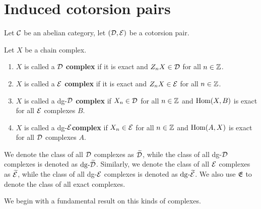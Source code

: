 \section{Induced cotorsion pairs}
Let $\mathcal{C}$ be an abelian category, let $(\mathcal{D}, \mathcal{E})$ be a cotorsion pair.

\begin{definition}
    Let $X$ be a chain complex.
    \begin{enumerate}
		\itemsep0em 
		\item $X$ is called a $\mathcal{D}$ \textbf{complex} if it is exact and $Z_n X \in \mathcal{D}$ for all $n \in \mathbb{Z}$.
		\item $X$ is called a $\mathcal{E}$ \textbf{complex} if it is exact and $Z_n X \in \mathcal{E}$ for all $n \in \mathbb{Z}$.
		\item $X$ is called a dg-$\mathcal{D}$ \textbf{complex} if $X_n \in \mathcal{D}$ for all $n \in \mathbb{Z}$ and $\mathrm{Hom}(X, B)$ is exact for all $\mathcal{E}$ complexes $B$.
		\item $X$ is called a dg-$\mathcal{E}$\textbf{complex} if $X_n \in \mathcal{E}$ for all $n \in \mathbb{Z}$ and $\mathrm{Hom}(A, X)$ is exact for all $\mathcal{D}$ complexes $A$.
	\end{enumerate}
    We denote the class of all $\mathcal{D}$ complexes as $\widetilde{\mathcal{D}}$, while the class of all dg-$\mathcal{D}$ complexes is denoted as $\mathrm{dg} \text{-}\widetilde{\mathcal{D}}$. Similarly, we denote the class of all $\mathcal{E}$ complexes as $\widetilde{\mathcal{E}}$, while the class of all dg-$\mathcal{E}$ complexes is denoted as $\mathrm{dg} \text{-}\widetilde{\mathcal{E}}$. We also use $\mathfrak{E}$ to denote the class of all exact complexes.
\end{definition}

We begin with a fundamental result on this kinds of complexes.

